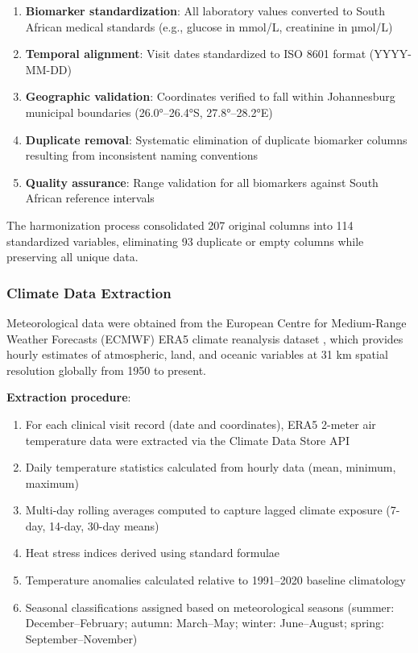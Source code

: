 \begin{enumerate}
    \item \textbf{Biomarker standardization}: All laboratory values converted to South African medical standards (e.g., glucose in mmol/L, creatinine in µmol/L)
    \item \textbf{Temporal alignment}: Visit dates standardized to ISO 8601 format (YYYY-MM-DD)
    \item \textbf{Geographic validation}: Coordinates verified to fall within Johannesburg municipal boundaries (26.0°--26.4°S, 27.8°--28.2°E)
    \item \textbf{Duplicate removal}: Systematic elimination of duplicate biomarker columns resulting from inconsistent naming conventions
    \item \textbf{Quality assurance}: Range validation for all biomarkers against South African reference intervals
\end{enumerate}

The harmonization process consolidated 207 original columns into 114 standardized variables, eliminating 93 duplicate or empty columns while preserving all unique data.

\subsubsection{Climate Data Extraction}

Meteorological data were obtained from the European Centre for Medium-Range Weather Forecasts (ECMWF) ERA5 climate reanalysis dataset \citep{hersbach2020era5}, which provides hourly estimates of atmospheric, land, and oceanic variables at 31 km spatial resolution globally from 1950 to present.

\textbf{Extraction procedure}:
\begin{enumerate}
    \item For each clinical visit record (date and coordinates), ERA5 2-meter air temperature data were extracted via the Climate Data Store API
    \item Daily temperature statistics calculated from hourly data (mean, minimum, maximum)
    \item Multi-day rolling averages computed to capture lagged climate exposure (7-day, 14-day, 30-day means)
    \item Heat stress indices derived using standard formulae
    \item Temperature anomalies calculated relative to 1991--2020 baseline climatology
    \item Seasonal classifications assigned based on meteorological seasons (summer: December--February; autumn: March--May; winter: June--August; spring: September--November)
\end{enumerate}

